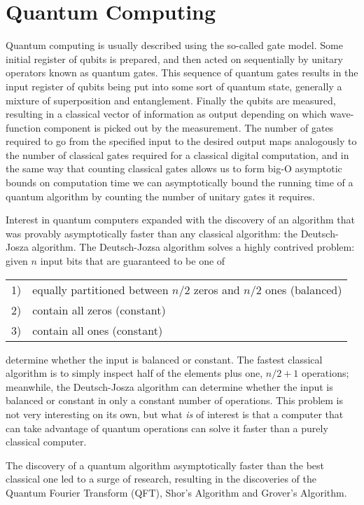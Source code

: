 \section{Quantum Computing}
Quantum computing is usually described using the so-called gate model.\cite{qc}  Some initial register of qubits is prepared, and then acted on sequentially by unitary operators known as quantum gates.  This sequence of quantum gates results in the input register of qubits being put into some sort of quantum state, generally a mixture of superposition and entanglement.  Finally the qubits are measured, resulting in a classical vector of information as output depending on which wave-function component is picked out by the measurement.  The number of gates required to go from the specified input to the desired output maps analogously to the number of classical gates required for a classical digital computation, and in the same way that counting classical gates allows us to form big-O asymptotic bounds on computation time we can asymptotically bound the running time of a quantum algorithm by counting the number of unitary gates it requires.

Interest in quantum computers expanded with the discovery of an algorithm that was provably asymptotically faster than any classical algorithm: the Deutsch-Josza algorithm.\cite{deutsch}  The Deutsch-Jozsa algorithm solves a highly contrived problem: given $n$ input bits that are guaranteed to be one of

\begin{center}
	\begin{tabular}{l l}
		1) & equally partitioned between $n/2$ zeros and $n/2$ ones (balanced) \\
		2) & contain all zeros (constant) \\
		3) & contain all ones (constant) \\
	\end{tabular}
\end{center}
determine whether the input is balanced or constant.  The fastest classical algorithm is to simply inspect half of the elements plus one, $n/2 + 1$ operations; meanwhile, the Deutsch-Josza algorithm can determine whether the input is balanced or constant in only a constant number of operations.  This problem is not very interesting on its own, but what \emph{is} of interest is that a computer that can take advantage of quantum operations can solve it faster than a purely classical computer.

The discovery of a quantum algorithm asymptotically faster than the best classical one led to a surge of research, resulting in the discoveries of the Quantum Fourier Transform (QFT)\cite{qcbook}, Shor's Algorithm\cite{shor} and Grover's Algorithm\cite{grover}.


